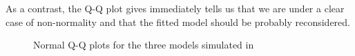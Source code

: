 \begin{example}
	As a contrast, the Q-Q plot gives  immediately tells us that we are under a clear case of non-normality and that the fitted model should be probably reconsidered.
	\begin{figure}[H]
		\centering
		\caption{Normal Q-Q plots for the three models simulated in }
		\label{fig:qq-example}
	\end{figure}


\end{example}
